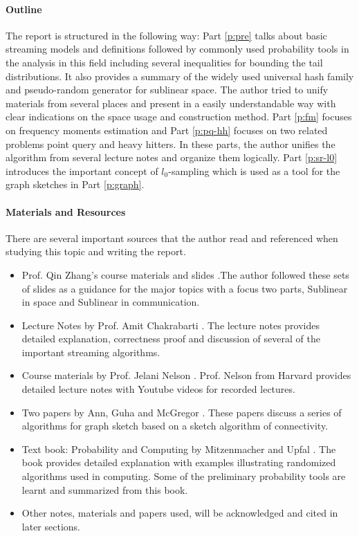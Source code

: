 \documentclass[11pt]{article}
\theoremstyle{plain}
\begin{document}
\paragraph{Outline}The report is structured in the following way: 
Part \ref{p:pre} talks about basic streaming models and definitions followed 
by commonly used probability tools in the analysis in this field including 
several inequalities for bounding the tail distributions. It also provides a 
summary of the widely used universal hash family and pseudo-random 
generator for sublinear space. The author tried to unify materials from 
several places and present in a easily understandable way with clear 
indications on the space usage and construction method. Part \ref{p:fm} 
focuses on frequency moments estimation and Part \ref{p:pq-hh} focuses on 
two related problems point query and heavy hitters. In these parts, the 
author unifies the algorithm from several lecture notes and organize them 
logically. Part \ref{p:sr-l0} introduces the important concept of 
$l_0$-sampling which is used as a tool for the graph sketches in Part 
\ref{p:graph}.


\paragraph{Materials and Resources }
There are several important sources that the author read and referenced 
when studying this topic and writing the report. 
\begin{itemize}
	\item Prof. Qin Zhang's course materials and 
	slides  \cite{zhang2017-slides}.The author followed these sets of slides as 
	a guidance for the major topics with a focus two parts, Sublinear in space 
	and Sublinear in communication. 
	\item Lecture Notes by Prof. Amit Chakrabarti  \cite{Cha2015-notes}. The 
	lecture notes provides detailed explanation, correctness proof and 
	discussion of several of the important streaming algorithms. 
	\item Course materials  by Prof. Jelani Nelson  \cite{Nel2015-web}. Prof. 
	Nelson from Harvard provides detailed lecture notes with Youtube videos 
	for recorded lectures. 
	\item Two papers by Ann, Guha and 
	McGregor  \cite{AGM2012-analyzing}  \cite{AGM2012-graph}. These 
	papers discuss a series of algorithms for graph sketch based on a sketch 
	algorithm of connectivity. 
	\item Text book: Probability and Computing by Mitzenmacher and 
	Upfal  \cite{MU-probability}. The book provides detailed explanation with 
	examples illustrating randomized algorithms used in computing. Some of 
	the preliminary probability tools are learnt and summarized from this book.
	\item Other notes, materials and papers used, will be acknowledged and 
	cited in later sections.
\end{itemize}


\pagebreak
\appendix


 
\end{document}
